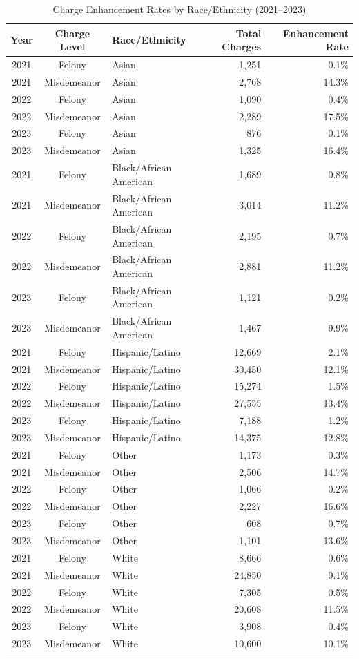 \begin{table}[htbp]
\caption{Charge Enhancement Rates by Race/Ethnicity (2021--2023)}
\label{tab:prosecution}
\begin{tabular}{cclrr}
\toprule\toprule
Year & Charge Level & Race/Ethnicity & Total Charges & Enhancement Rate \\
\midrule\midrule
2021 & Felony & Asian & 1,251 & 0.1\% \\
2021 & Misdemeanor & Asian & 2,768 & 14.3\% \\
2022 & Felony & Asian & 1,090 & 0.4\% \\
2022 & Misdemeanor & Asian & 2,289 & 17.5\% \\
2023 & Felony & Asian & 876 & 0.1\% \\
2023 & Misdemeanor & Asian & 1,325 & 16.4\% \\
2021 & Felony & Black/African American & 1,689 & 0.8\% \\
2021 & Misdemeanor & Black/African American & 3,014 & 11.2\% \\
2022 & Felony & Black/African American & 2,195 & 0.7\% \\
2022 & Misdemeanor & Black/African American & 2,881 & 11.2\% \\
2023 & Felony & Black/African American & 1,121 & 0.2\% \\
2023 & Misdemeanor & Black/African American & 1,467 & 9.9\% \\
2021 & Felony & Hispanic/Latino & 12,669 & 2.1\% \\
2021 & Misdemeanor & Hispanic/Latino & 30,450 & 12.1\% \\
2022 & Felony & Hispanic/Latino & 15,274 & 1.5\% \\
2022 & Misdemeanor & Hispanic/Latino & 27,555 & 13.4\% \\
2023 & Felony & Hispanic/Latino & 7,188 & 1.2\% \\
2023 & Misdemeanor & Hispanic/Latino & 14,375 & 12.8\% \\
2021 & Felony & Other & 1,173 & 0.3\% \\
2021 & Misdemeanor & Other & 2,506 & 14.7\% \\
2022 & Felony & Other & 1,066 & 0.2\% \\
2022 & Misdemeanor & Other & 2,227 & 16.6\% \\
2023 & Felony & Other & 608 & 0.7\% \\
2023 & Misdemeanor & Other & 1,101 & 13.6\% \\
2021 & Felony & White & 8,666 & 0.6\% \\
2021 & Misdemeanor & White & 24,850 & 9.1\% \\
2022 & Felony & White & 7,305 & 0.5\% \\
2022 & Misdemeanor & White & 20,608 & 11.5\% \\
2023 & Felony & White & 3,908 & 0.4\% \\
2023 & Misdemeanor & White & 10,600 & 10.1\% \\
\bottomrule\bottomrule
\end{tabular}
\end{table}
